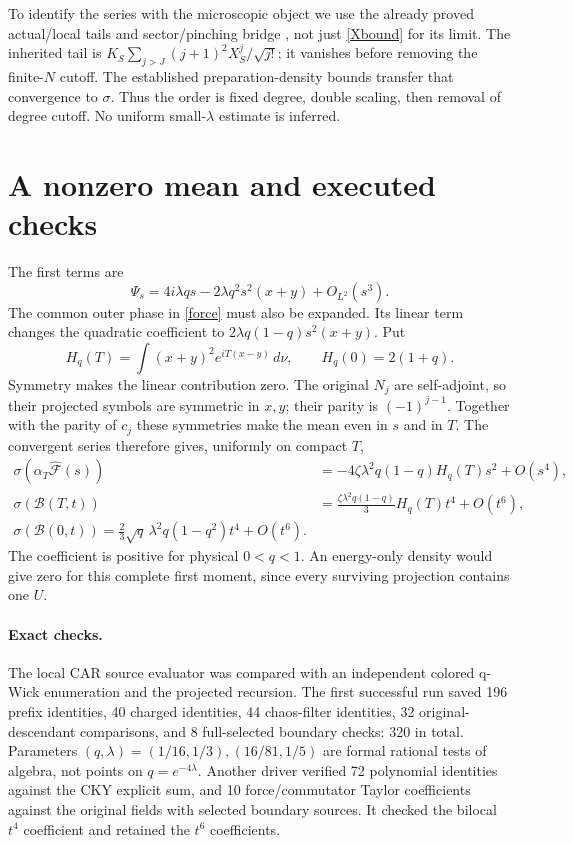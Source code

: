 \documentclass[11pt]{article}
\begin{document}
To identify the series with the microscopic object we use the
already proved actual/local tails and sector/pinching bridge
\cite{marked,desc,sector}, not just \eqref{Xbound} for its limit.
The inherited tail is $K_S\sum_{j>J}(j+1)^2X_S^j/\sqrt{j!}$;
it vanishes before removing the finite-$N$ cutoff. The established
preparation-density bounds transfer that convergence to $\sigma$.
Thus the order is fixed degree, double scaling, then removal of
degree cutoff. No uniform small-$\lambda$ estimate is inferred.

\newpage
\section{A nonzero mean and executed checks}
The first terms are
\[
 \Psi_s=4i\lambda q s
             -2\lambda q^2s^2(x+y)+O_{L^2}(s^3).
\]
The common outer phase in \eqref{force} must also be expanded.
Its linear term changes the quadratic coefficient to
$2\lambda q(1-q)s^2(x+y)$. Put
\[
 H_q(T)=\int(x+y)^2e^{iT(x-y)}\,d\nu,
 \qquad H_q(0)=2(1+q).
\]
Symmetry makes the linear contribution zero. The original $N_j$
are self-adjoint, so their projected symbols are symmetric in
$x,y$; their parity is $(-1)^{j-1}$. Together with the parity of
$c_j$ these symmetries make the mean even in $s$ and in $T$.
The convergent series therefore gives, uniformly on compact $T$,
\begin{align}
 \sigma(\alpha_T\widehat{\mathcal F}(s))
       &=-4\zeta\lambda^2q(1-q)H_q(T)s^2+O(s^4),\\
 \sigma(\mathcal B(T,t))
       &=\frac{\zeta\lambda^2q(1-q)}3H_q(T)t^4+O(t^6),\\
 \boxed{\sigma(\mathcal B(0,t))
       =\frac23\sqrt q\,\lambda^2q(1-q^2)t^4+O(t^6).}
\end{align}
The coefficient is positive for physical $0<q<1$.
An energy-only density would give zero for this complete first
moment, since every surviving projection contains one $U$.

\paragraph{Exact checks.}
The local CAR source evaluator was compared with an independent
colored q-Wick enumeration and the projected recursion. The first
successful run saved 196 prefix identities, 40 charged identities,
44 chaos-filter identities, 32 original-descendant comparisons,
and 8 full-selected boundary checks: 320 in total.
Parameters $(q,\lambda)=(1/16,1/3),(16/81,1/5)$ are formal rational
tests of algebra, not points on $q=e^{-4\lambda}$.
Another driver verified 72 polynomial identities against the CKY
explicit sum, and 10 force/commutator Taylor coefficients against
the original fields with selected boundary sources. It checked
the bilocal $t^4$ coefficient and retained the $t^6$ coefficients.
\end{document}
